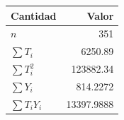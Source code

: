 \begin{tabular}{l r}
\toprule
Cantidad & Valor \\
\midrule
$n$ & \num{351} \\
$\sum T_i$ & \num{6250.89} \\
$\sum T_i^2$ & \num{123882.34} \\
$\sum Y_i$ & \num{814.2272} \\
$\sum T_i Y_i$ & \num{13397.9888} \\
\bottomrule
\end{tabular}

